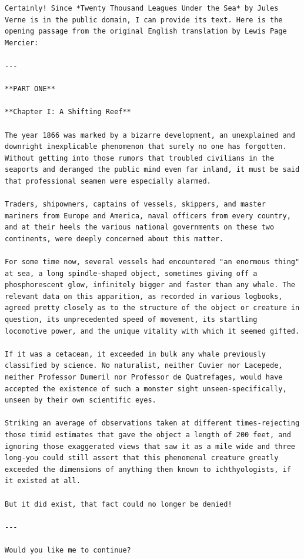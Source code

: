 \documentclass{article}
\begin{document}
	\begin{lstlisting}
Certainly! Since *Twenty Thousand Leagues Under the Sea* by Jules Verne is in the public domain, I can provide its text. Here is the opening passage from the original English translation by Lewis Page Mercier:

---

**PART ONE**

**Chapter I: A Shifting Reef**

The year 1866 was marked by a bizarre development, an unexplained and downright inexplicable phenomenon that surely no one has forgotten. Without getting into those rumors that troubled civilians in the seaports and deranged the public mind even far inland, it must be said that professional seamen were especially alarmed.

Traders, shipowners, captains of vessels, skippers, and master mariners from Europe and America, naval officers from every country, and at their heels the various national governments on these two continents, were deeply concerned about this matter.

For some time now, several vessels had encountered "an enormous thing" at sea, a long spindle-shaped object, sometimes giving off a phosphorescent glow, infinitely bigger and faster than any whale. The relevant data on this apparition, as recorded in various logbooks, agreed pretty closely as to the structure of the object or creature in question, its unprecedented speed of movement, its startling locomotive power, and the unique vitality with which it seemed gifted.

If it was a cetacean, it exceeded in bulk any whale previously classified by science. No naturalist, neither Cuvier nor Lacepede, neither Professor Dumeril nor Professor de Quatrefages, would have accepted the existence of such a monster sight unseen-specifically, unseen by their own scientific eyes.

Striking an average of observations taken at different times-rejecting those timid estimates that gave the object a length of 200 feet, and ignoring those exaggerated views that saw it as a mile wide and three long-you could still assert that this phenomenal creature greatly exceeded the dimensions of anything then known to ichthyologists, if it existed at all.

But it did exist, that fact could no longer be denied!

---

Would you like me to continue?
	\end{lstlisting}
\end{document}
